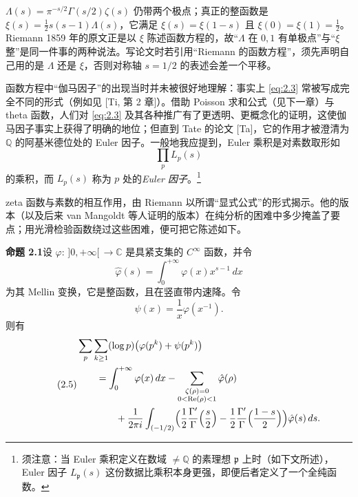 \begin{annote}
$\Lambda(s)=\pi^{-s/2}\Gamma(s/2)\zeta(s)$ 仍带两个极点；真正的整函数是 $\xi(s)=\tfrac12 s(s-1)\Lambda(s)$，它满足 $\xi(s)=\xi(1-s)$ 且 $\xi(0)=\xi(1)=\tfrac12$。Riemann 1859 年的原文正是以 $\xi$ 陈述函数方程的，故“$\Lambda$ 在 $0,1$ 有单极点”与“$\xi$ 整”是同一件事的两种说法。写论文时若引用“Riemann 的函数方程”，须先声明自己用的是 $\Lambda$ 还是 $\xi$，否则对称轴 $s=1/2$ 的表述会差一个平移。
\par\vspace{0.15em}{\raggedleft 【来源：Riemann 1859《Über die Anzahl der Primzahlen unter einer gegebenen Grösse》（A）；Titchmarsh 同上 Ch.~2（A）】\par}
\end{annote}

函数方程中“伽马因子”的出现当时并未被很好地理解：事实上 \eqref{eq:2.3} 常被写成完全不同的形式（例如见 [Ti, 第 2 章]）。借助 Poisson 求和公式（见下一章）与 theta 函数，人们对 \eqref{eq:2.3} 及其各种推广有了更透明、更概念化的证明，这使伽马因子事实上获得了明确的地位；但直到 Tate 的论文 [Ta]，它的作用才被澄清为 $\mathbb{Q}$ 的阿基米德位处的 Euler 因子。一般地我应提到，Euler 乘积是对素数取形如
\begin{equation}\tag{2.4}\label{eq:2.4}
\prod_{p}L_p(s)
\end{equation}
的乘积，而 $L_p(s)$ 称为 $p$ 处的\emph{Euler 因子}。\footnote{须注意：当 Euler 乘积定义在数域 $\neq\mathbb{Q}$ 的素理想 $\mathfrak{p}$ 上时（如下文所述），Euler 因子 $L_{\mathfrak{p}}(s)$ 这份数据比乘积本身更强，即便后者定义了一个全纯函数。}

zeta 函数与素数的相互作用，由 Riemann 以所谓“显式公式”的形式揭示。他的版本（以及后来 van Mangoldt 等人证明的版本）在纯分析的困难中多少掩盖了要点；用光滑检验函数绕过这些困难，便可把它陈述如下。

\par\medskip\noindent\textbf{命题 2.1}\quad 设 $\varphi\colon\,]0,+\infty[\,\to\mathbb{C}$ 是具紧支集的 $C^{\infty}$ 函数，并令
\[
\hat\varphi(s)=\int_{0}^{+\infty}\varphi(x)x^{s-1}\,dx
\]
为其 Mellin 变换，它是整函数，且在竖直带内速降。令
\[
\psi(x)=\frac{1}{x}\varphi(x^{-1}).
\]
则有
\begin{equation}\tag{2.5}\label{eq:2.5}
\begin{aligned}
&\sum_{p}\sum_{k\ge 1}(\log p)\bigl(\varphi(p^{k})+\psi(p^{k})\bigr)\\
&\qquad=\int_{0}^{+\infty}\varphi(x)\,dx
-\sum_{\substack{\zeta(\rho)=0\\ 0<\operatorname{Re}(\rho)<1}}\hat\varphi(\rho)\\
&\qquad\qquad+\frac{1}{2\pi i}\int_{(-1/2)}
\Bigl(\frac{1}{2}\frac{\Gamma'}{\Gamma}\Bigl(\frac{s}{2}\Bigr)
-\frac{1}{2}\frac{\Gamma'}{\Gamma}\Bigl(\frac{1-s}{2}\Bigr)\Bigr)\hat\varphi(s)\,ds .
\end{aligned}
\end{equation}

